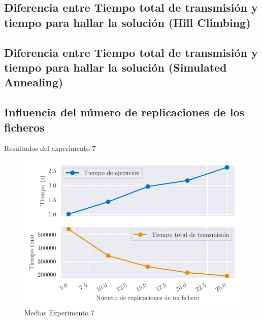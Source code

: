 \subsection{Diferencia entre Tiempo total de transmisión y tiempo para hallar la solución (Hill Climbing)}

\subsection{Diferencia entre Tiempo total de transmisión y tiempo para hallar la solución (Simulated Annealing)}

\subsection{Influencia del número de replicaciones de los ficheros}

\begin{table}[H]
    \centering
    \caption{Resultados del experimento 7}%
    \label{tab:ex7}
    \begin{center}
    
    \end{center}
\end{table}

\begin{figure}[H]
    \centering
    \includegraphics{include/plots/ex7_means.pdf}
    \caption{Medias Experimento 7}%
    \label{fig:ex7means}
\end{figure}

